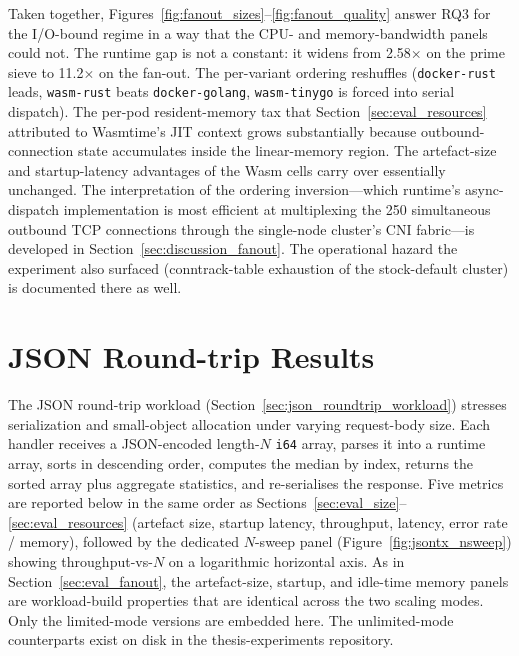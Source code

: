 \begin{sloppypar}
Taken together, Figures~\ref{fig:fanout_sizes}--\ref{fig:fanout_quality} answer RQ3 for the I/O-bound regime in a way that the CPU- and memory-bandwidth panels could not. The runtime gap is not a constant: it widens from 2.58$\times$ on the prime sieve to 11.2$\times$ on the fan-out. The per-variant ordering reshuffles (\texttt{docker-rust} leads, \texttt{wasm-rust} beats \texttt{docker-golang}, \texttt{wasm-tinygo} is forced into serial dispatch). The per-pod resident-memory tax that Section~\ref{sec:eval_resources} attributed to Wasmtime's \acs{JIT} context grows substantially because outbound-connection state accumulates inside the linear-memory region. The artefact-size and startup-latency advantages of the \acs{Wasm} cells carry over essentially unchanged. The interpretation of the ordering inversion---which runtime's async-dispatch implementation is most efficient at multiplexing the 250 simultaneous outbound \acs{TCP} connections through the single-node cluster's \acs{CNI} fabric---is developed in Section~\ref{sec:discussion_fanout}. The operational hazard the experiment also surfaced (conntrack-table exhaustion of the stock-default cluster) is documented there as well.
\end{sloppypar}

\section{JSON Round-trip Results}
\label{sec:eval_jsontx}

\begin{sloppypar}
The \acs{JSON} round-trip workload (Section~\ref{sec:json_roundtrip_workload}) stresses serialization and small-object allocation under varying request-body size. Each handler receives a JSON-encoded length-$N$ \texttt{i64} array, parses it into a runtime array, sorts in descending order, computes the median by index, returns the sorted array plus aggregate statistics, and re-serialises the response. Five metrics are reported below in the same order as Sections~\ref{sec:eval_size}--\ref{sec:eval_resources} (artefact size, startup latency, throughput, latency, error rate / memory), followed by the dedicated $N$-sweep panel (Figure~\ref{fig:jsontx_nsweep}) showing throughput-vs-$N$ on a logarithmic horizontal axis. As in Section~\ref{sec:eval_fanout}, the artefact-size, startup, and idle-time memory panels are workload-build properties that are identical across the two scaling modes. Only the limited-mode versions are embedded here. The unlimited-mode counterparts exist on disk in the thesis-experiments repository.
\end{sloppypar}


